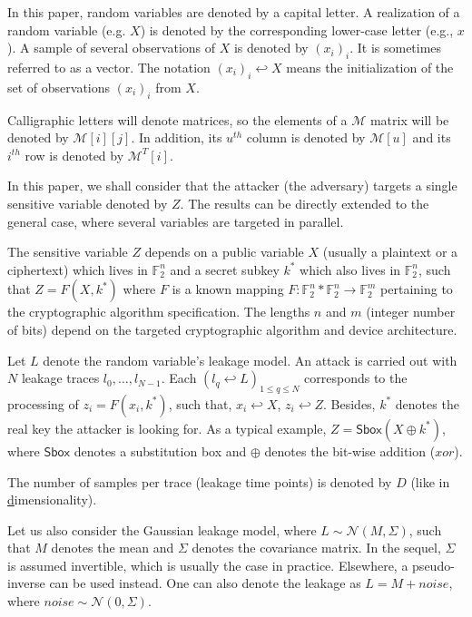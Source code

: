 \documentclass[conference,twocolumn]{IEEEtran}
\newcommand\F{\mathbb{F}}
\begin{document}
In this paper, random variables are denoted by a capital letter. 
A realization of a random variable (e.g. $X$) is denoted by the corresponding lower-case letter (e.g., $x$).
A sample of several observations of $X$ is denoted by $(x_i)_i$. It is sometimes referred to as a vector. 
The notation $(x_i)_i \hookleftarrow X$ means the initialization of the set of observations $(x_i)_i$ from $X$.


Calligraphic letters will denote matrices, so the elements of a $\mathcal{M}$ matrix will be denoted by $\mathcal{M}[i][j]$. 
In addition, its $u^{th}$ column is denoted by $\mathcal{M}[u]$ and its $i^{th}$ row is denoted by $\mathcal{M}^T[i]$. 


In this paper, we shall consider that the attacker (the adversary) targets a single sensitive variable denoted by $Z$. 
The results can be directly extended to the general case, where several variables are targeted in parallel.

The sensitive variable $Z$ depends on a public variable $X$ (usually a plaintext or a ciphertext) which lives in $\F_2^n$ and a secret subkey $k^*$ which also lives in $\F_2^n$, such that $ Z = F(X, k^*)$ where $F$ is a known mapping $ F: \F_2^n * \F_2^n \longrightarrow \F_2^m$ pertaining to the cryptographic algorithm specification.
The lengths $n$ and $m$ (integer number of bits) depend on the targeted cryptographic algorithm and device architecture. 


Let $L$ denote the random variable's leakage model. 
An attack is carried out with $N$ leakage traces $l_0, \ldots, l_{N - 1}$.
Each $(l_q\hookleftarrow L)_{1\leq q\leq N}$ corresponds to the processing of $z_i = F(x_i,k^*)$,
such that, $x_i\hookleftarrow X$, $z_i \hookleftarrow Z$. Besides, $k^*$ denotes the real key the attacker is looking for. 
As a typical example,
$Z = \mathsf{Sbox} (X \oplus k^*)$, where $\mathsf{Sbox}$ denotes a substitution box and $\oplus$ denotes the bit-wise addition ($xor$). 

The number of samples per trace (leakage time points) is denoted by $D$ (like in \underline{d}imensionality).   

Let us also consider the Gaussian leakage model, where $L \sim \mathcal{N}(M,\Sigma)$, such that $M$ denotes the mean and $\Sigma$ denotes the covariance matrix. 
In the sequel, $\Sigma$ is assumed invertible, which is usually the case in practice.
Elsewhere, a pseudo-inverse can be used instead.
One can also denote the leakage as
$L=M+noise$, where $noise \sim \mathcal{N}(0,\Sigma)$.
\end{document}
